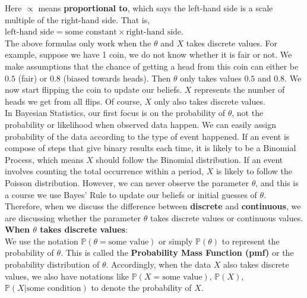 \documentclass{article}
\begin{document}
Here $\propto$ means \textbf{proportional to}, which says the left-hand side is a scale multiple of the right-hand side. That is, $\text{left-hand side} = \text{some constant} \times \text{right-hand side}$.\\

The above formulas only work when the $\theta$ and $X$ takes discrete values. For example, suppose we have 1 coin, we do not know whether it is fair or not. We make assumptions that the chance of getting a head from this coin can either be $0.5$ (fair) or $0.8$ (biased towards heads). Then $\theta$ only takes values $0.5$ and $0.8$. We now start flipping the coin to update our beliefs. $X$ represents the number of heads we get from all flips. Of course, $X$ only also takes discrete values.\\

In Bayesian Statistics, our first focus is on the probability of $\theta$, not the probability or likelihood when observed data happen. We can easily assign probability of the data according to the type of event happened. If an event is compose of steps that give binary results each time, it is likely to be a Binomial Process, which means $X$ should follow the Binomial distribution. If an event involves counting the total occurrence within a period, $X$ is likely to follow the Poisson distribution. However, we can never observe the parameter $\theta$, and this is a course we use Bayes' Rule to update our beliefs or initial guesses of $\theta$.\\

Therefore, when we discuss the difference between \textbf{discrete} and \textbf{continuous}, we are discussing whether the parameter $\theta$ takes discrete values or continuous values.\\

\textbf{When $\theta$ takes discrete values}:\\

We use the notation $\mathbb{P}(\theta = \text{some value})$ or simply $\mathbb{P}(\theta)$ to represent the probability of $\theta$. This is called the \textbf{Probability Mass Function (pmf)} or the probability distribution of $\theta$. Accordingly, when the data $X$ also takes discrete values, we also have notations like $\mathbb{P}(X=\text{some value})$, $\mathbb{P}(X)$, $\mathbb{P}(X|\text{some condition})$ to denote the probability of $X$.\\
\end{document}
